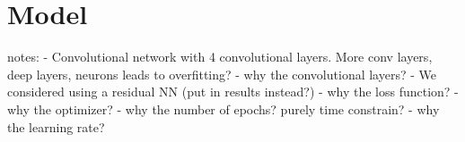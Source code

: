 \section{Model}
notes:
- Convolutional network with 4 convolutional layers. More conv layers, deep layers, neurons leads to overfitting?
- why the convolutional layers?
- We considered using a residual NN (put in results instead?)
- why the loss function?
- why the optimizer?
- why the number of epochs? purely time constrain?
- why the learning rate?